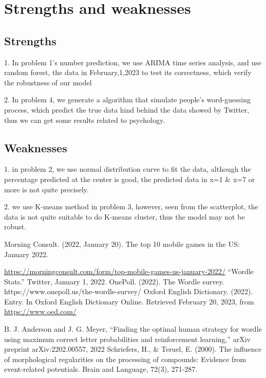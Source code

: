 \documentclass{mcmthesis}
\begin{document}
\section{Strengths and weaknesses}

\subsection{Strengths}

\hspace*{0.6cm} 1. In problem 1’s number prediction, we use ARIMA time series analysis, and use random forest, the data in February,1,2023 to test its correctness, which verify the robustness of our model

 2. In problem 4, we generate a algorithm that simulate people’s word-guessing process, which predict the true data hind behind the data showed by Twitter, thus we can get some results related to psychology.

\subsection{Weaknesses}
 \hspace*{0.6cm}1. in problem 2, we use normal distribution curve to fit the data, although the percentage predicted at the center is good, the predicted data in x=1 & x=7 or more is not quite precisely.

 2. we use K-means method in problem 3, however, seen from the scatterplot, the data is not quite suitable to do K-means cluster, thus the model may not be robust.
















\begin{thebibliography}{99}
 Morning Consult. (2022, January 20). The top 10 mobile games in the US: January 2022. 

\url{https://morningconsult.com/form/top-mobile-games-us-january-2022/}
“Wordle Stats.” Twitter, January 1, 2022.
 OnePoll. (2022). The Wordle survey. https://www.onepoll.us/the-wordle-survey/
 Oxford English Dictionary. (2022). Entry. In Oxford English Dictionary Online. Retrieved February 20, 2023, from \url{https://www.oed.com/}

 B. J. Anderson and J. G. Meyer, “Finding the optimal human strategy for wordle using maximum correct letter probabilities and reinforcement learning,” arXiv preprint arXiv:2202.00557, 2022
Schriefers, H., & Teruel, E. (2000). The influence of morphological regularities on the processing of compounds: Evidence from event-related potentials. Brain and Language, 72(3), 271-287.
\end{thebibliography}
\newpage
\end{document}
